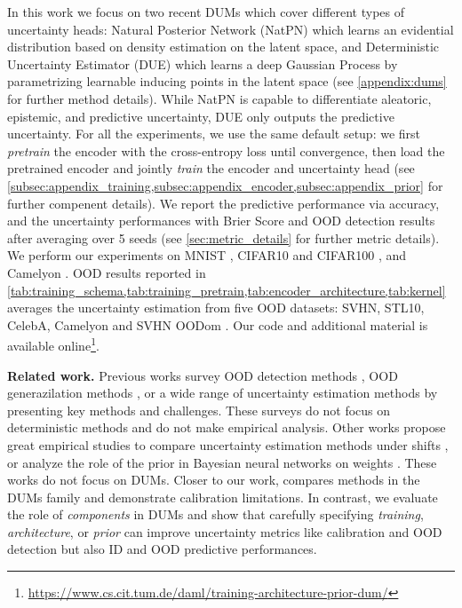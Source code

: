 In this work we focus on two recent DUMs which cover different types of uncertainty heads: Natural Posterior Network (NatPN) \cite{charpentier2022natpn} which learns an evidential distribution based on density estimation on the latent space, and Deterministic Uncertainty Estimator (DUE) \citep{van2021due} which learns a deep Gaussian Process by parametrizing learnable inducing points in the latent space (see \cref{appendix:dums} for further method details). While NatPN is capable to differentiate aleatoric, epistemic, and predictive uncertainty, DUE only outputs the predictive uncertainty. 
For all the experiments, we use the same default setup: we first \emph{pretrain} the encoder with the cross-entropy loss until convergence, then load the pretrained encoder and jointly \emph{train} the encoder and uncertainty head (see \cref{subsec:appendix_training,subsec:appendix_encoder,subsec:appendix_prior} for further compenent details). We report the predictive performance via accuracy, and the uncertainty performances with Brier Score and OOD detection results after averaging over 5 seeds (see \cref{sec:metric_details} for further metric details). We perform our experiments on MNIST \citep{lecun1998mnist}, CIFAR10 and CIFAR100 \citep{krizhevsky09cifar}, and Camelyon \citep{koh2021wilds}. OOD results reported in 
\cref{tab:training_schema,tab:training_pretrain,tab:encoder_architecture,tab:kernel} averages the uncertainty estimation from five OOD datasets: SVHN, STL10, CelebA, Camelyon and SVHN OODom \citep{netzer2011svhn, coates2011stl10, liu2015celeba}. Our code and additional material is available online\footnote{\url{https://www.cs.cit.tum.de/daml/training-architecture-prior-dum/}}.

\textbf{Related work.} Previous works survey OOD detection methods \citep{yang2021ooddet}, OOD generazilation methods \citep{shen2021oodgen}, or a wide range of uncertainty estimation methods \citep{gawlikowski2021survey,psaros2023survey,ulmer2021survey,abdar2021survey} by presenting key methods and challenges. These surveys do not focus on deterministic methods and do not make empirical analysis.
Other works propose great empirical studies to compare uncertainty estimation methods under shifts \citep{ovadia2019shift}, or analyze the role of the prior in Bayesian neural networks on weights \citep{wenzel2020prior_cpe, fortuin2022prior, noci2021prior_cpe, kapoor2022prior_cpe}. These works do not focus on DUMs. Closer to our work,  \citet{postels2022practicalitydum} compares methods in the DUMs family and demonstrate calibration limitations. In contrast, we evaluate the role of \emph{components} in DUMs and show that carefully specifying \emph{training}, \emph{architecture}, or \emph{prior} can improve uncertainty metrics like calibration and OOD detection but also ID and OOD predictive performances.

